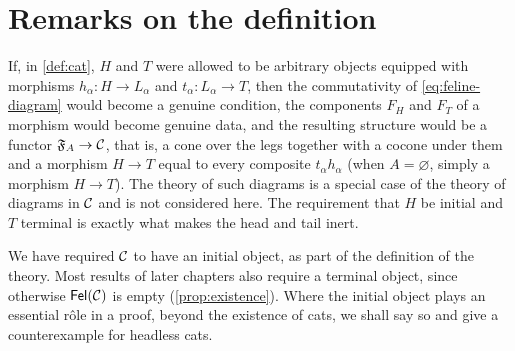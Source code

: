 \section{Remarks on the definition}\label{sec:remarks-def}

\begin{remark}\label{rem:why-initial}
If, in \cref{def:cat}, $H$ and $T$ were allowed to be arbitrary objects
equipped with morphisms $h_\alpha\colon H\to L_\alpha$ and
$t_\alpha\colon L_\alpha\to T$, then the commutativity of
\eqref{eq:feline-diagram} would become a genuine condition, the components
$F_H$ and $F_T$ of a morphism would become genuine data, and the resulting
structure would be a functor $\mathfrak{F}_A\to\mathcal{C}$, that is, a cone over the legs
together with a cocone under them and a morphism $H\to T$ equal to every
composite $t_\alpha h_\alpha$ (when $A=\varnothing$, simply a morphism $H\to T$). The theory of such diagrams is a special
case of the theory of diagrams in $\mathcal{C}$ and is not considered here. The
requirement that $H$ be initial and $T$ terminal is exactly what makes the
head and tail inert.
\end{remark}

\begin{remark}\label{rem:standing}
We have required $\mathcal{C}$ to have an initial object, as part of the definition of
the theory. Most results of later chapters also require a terminal object,
since otherwise $\mathsf{Fel}(\mathcal{C})$ is empty (\cref{prop:existence}). Where the
initial object plays an essential r\^ole in a proof, beyond the existence of
cats, we shall say so and give a counterexample for headless cats.
\end{remark}
